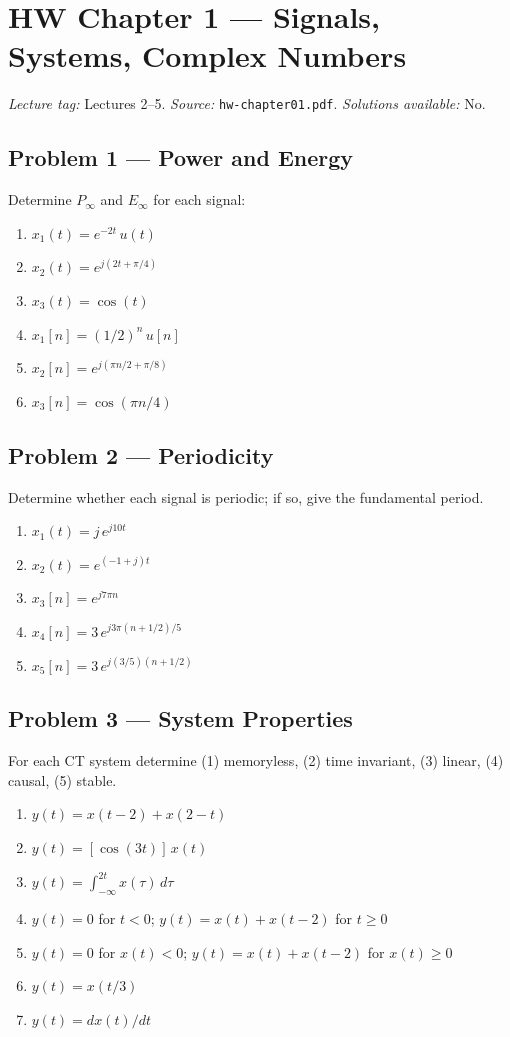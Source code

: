 \documentclass[11pt]{article}
\begin{document}
\section{HW Chapter 1 --- Signals, Systems, Complex Numbers}
\emph{Lecture tag:} Lectures 2--5. \emph{Source:} \texttt{hw-chapter01.pdf}. \emph{Solutions available:} No.

\subsection{Problem 1 --- Power and Energy}
Determine $P_\infty$ and $E_\infty$ for each signal:
\begin{enumerate}[label=(\alph*)]
  \item $x_1(t) = e^{-2t}\,u(t)$
  \item $x_2(t) = e^{j(2t+\pi/4)}$
  \item $x_3(t) = \cos(t)$
  \item $x_1[n] = (1/2)^n\,u[n]$
  \item $x_2[n] = e^{j(\pi n/2 + \pi/8)}$
  \item $x_3[n] = \cos(\pi n/4)$
\end{enumerate}

\subsection{Problem 2 --- Periodicity}
Determine whether each signal is periodic; if so, give the fundamental period.
\begin{enumerate}[label=(\alph*)]
  \item $x_1(t) = j\,e^{j10 t}$
  \item $x_2(t) = e^{(-1+j)t}$
  \item $x_3[n] = e^{j 7\pi n}$
  \item $x_4[n] = 3\,e^{j 3\pi(n+1/2)/5}$
  \item $x_5[n] = 3\,e^{j(3/5)(n+1/2)}$
\end{enumerate}

\subsection{Problem 3 --- System Properties}
For each CT system determine (1) memoryless, (2) time invariant, (3) linear, (4) causal, (5) stable.
\begin{enumerate}[label=(\alph*)]
  \item $y(t) = x(t-2) + x(2-t)$
  \item $y(t) = [\cos(3t)]\,x(t)$
  \item $y(t) = \int_{-\infty}^{2t} x(\tau)\,d\tau$
  \item $y(t) = 0$ for $t<0$; $y(t) = x(t)+x(t-2)$ for $t\ge 0$
  \item $y(t) = 0$ for $x(t)<0$; $y(t) = x(t)+x(t-2)$ for $x(t)\ge 0$
  \item $y(t) = x(t/3)$
  \item $y(t) = dx(t)/dt$
\end{enumerate}
\end{document}
